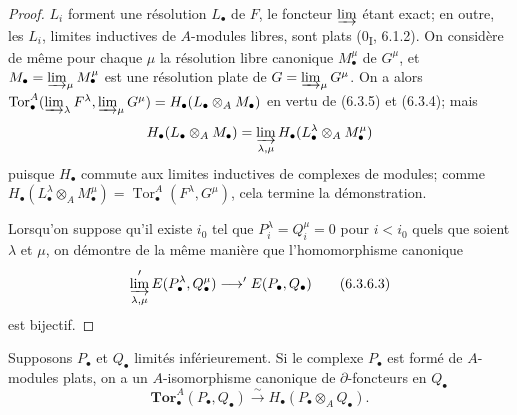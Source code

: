 \begin{proof}
$L_i$ forment une résolution $L_\bullet$ de $F$, le foncteur
$\varinjlim$ étant exact; en outre, les $L_i$, limites inductives de
$A$-modules libres, sont plats (0\textsubscript{I}, 6.1.2). On considère de
même pour chaque $\mu$ la résolution libre canonique $M_\bullet^\mu$ de
$G^\mu$, et $M_\bullet=\varinjlim_\mu M_\bullet^\mu$ est une résolution plate
de $G=\varinjlim_\mu G^\mu$. On a alors
$\operatorname{Tor}_\bullet^A(\varinjlim_\lambda F^\lambda,
\varinjlim_\mu G^\mu)=H_\bullet(L_\bullet\otimes_A M_\bullet)$ en vertu de
(6.3.5) et (6.3.4); mais
\[
  H_\bullet(L_\bullet\otimes_A M_\bullet)
  =\varinjlim_{\lambda,\mu}
   H_\bullet(L_\bullet^\lambda\otimes_A M_\bullet^\mu)
\]
puisque $H_\bullet$ commute aux limites inductives de complexes de modules;
comme $H_\bullet(L_\bullet^\lambda\otimes_A M_\bullet^\mu)
=\operatorname{Tor}_\bullet^A(F^\lambda,G^\mu)$, cela termine la
démonstration.

Lorsqu'on suppose qu'il existe $i_0$ tel que
$P_i^\lambda=Q_i^\mu=0$ pour $i<i_0$ quels que soient $\lambda$ et $\mu$, on
démontre de la même manière que l'homomorphisme canonique
\[
  \varinjlim_{\lambda,\mu}'E(P_\bullet^\lambda,Q_\bullet^\mu)
  \longrightarrow'E(P_\bullet,Q_\bullet)
  \tag{6.3.6.3}\label{III.6.3.6.3.fr}
\]
est bijectif.
\end{proof}

\begin{proposition}[6.3.7]
Supposons $P_\bullet$ et $Q_\bullet$ limités inférieurement. Si le complexe
$P_\bullet$ est formé de $A$-modules plats, on a un $A$-isomorphisme
canonique de $\partial$-foncteurs en $Q_\bullet$
\[
  \mathbf{Tor}_\bullet^A(P_\bullet,Q_\bullet)
  \xrightarrow{\sim}H_\bullet(P_\bullet\otimes_A Q_\bullet).
  \tag{6.3.7.1}\label{III.6.3.7.1.fr}
\]
\end{proposition}

